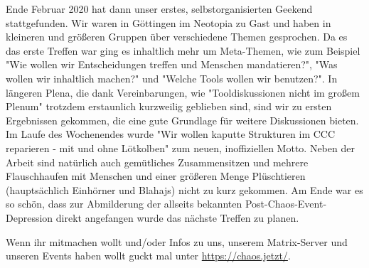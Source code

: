 \begin{DSarticle}[
    title={chaos.jetzt},
    author=ruru4143, email=ruru-cj-ds@r3.at,
    head=chaos.jetzt,
    tocentry=chaos.jetzt,
]
Ende Februar 2020 hat dann unser erstes, selbstorganisierten Geekend stattgefunden. Wir waren in Göttingen im Neotopia zu Gast und haben 
in kleineren und größeren Gruppen über verschiedene Themen gesprochen. Da es das erste Treffen war ging es inhaltlich mehr um Meta-Themen,
wie zum Beispiel "Wie wollen wir Entscheidungen treffen und Menschen mandatieren?", "Was wollen wir inhaltlich machen?" und "Welche Tools 
wollen wir benutzen?". In längeren Plena, die dank Vereinbarungen, wie "Tooldiskussionen nicht im großem Plenum" trotzdem erstaunlich
kurzweilig geblieben sind, sind wir zu ersten Ergebnissen gekommen, die eine gute Grundlage für weitere Diskussionen bieten. Im Laufe des
Wochenendes wurde "Wir wollen kaputte Strukturen im CCC reparieren - mit und ohne Lötkolben" zum neuen, inoffiziellen Motto. Neben der 
Arbeit sind natürlich auch gemütliches Zusammensitzen und mehrere Flauschhaufen mit Menschen und einer größeren Menge Plüschtieren 
(hauptsächlich Einhörner und Blahajs) nicht zu kurz gekommen. Am Ende war es so schön, dass zur Abmilderung der allseits bekannten
Post-Chaos-Event-Depression direkt angefangen wurde das nächste Treffen zu planen.

Wenn ihr mitmachen wollt und/oder Infos zu uns, unserem Matrix-Server und unseren Events haben wollt guckt mal unter \url{https://chaos.jetzt/}.





\end{DSarticle}

